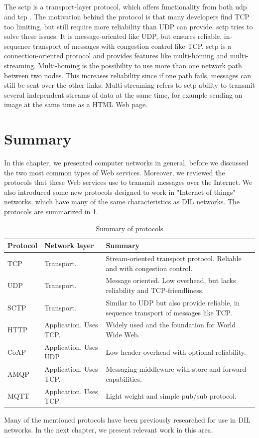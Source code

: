 \subsection{}

The \gls{sctp} is a transport-layer protocol, which offers functionality from
both \gls{udp} and \gls{tcp} \cite{rfc-sctp}. The motivation behind the protocol
is that many developers find TCP too limiting, but still require more
reliability than UDP can provide. \gls{sctp} tries to solve these issues. It is
message-oriented like UDP, but ensures reliable, in-sequence transport of
messages with congestion control like TCP. \gls{sctp} is a connection-oriented
protocol and provides features like multi-homing and multi-streaming.
Multi-homing is the possibility to use more than one network path between two
nodes. This increases reliability since if one path fails, messages can still be
sent over the other links. Multi-streaming refers to \gls{sctp} ability to
transmit several independent streams of data at the same time, for example
sending an image at the same time as a HTML Web page.


\section{Summary}

In this chapter, we presented computer networks in general, before we discussed
the two most common types of Web services. Moreover, we reviewed the protocols
that these Web services use to transmit messages over the Internet. We also
introduced some new protocols designed to work in "Internet of things" networks,
which have many of the same characteristics as DIL networks. The protocols are
summarized in \cref{table:protocols:summary}.

\begin{table}[h]
\begin{tabularx}{\textwidth}{| l | l | X |}
\hline
  \textbf{Protocol} & \textbf{Network layer} & \textbf{Summary} \\ \hline
  TCP & Transport. & Stream-oriented transport protocol. Reliable and with congestion control. \\ \hline
  UDP & Transport. & Message oriented. Low overhead, but lacks reliability and TCP-friendliness. \\ \hline
  SCTP & Transport. & Similar to UDP but also provide reliable, in sequence transport of messages like TCP. \\ \hline
  HTTP & Application. Uses TCP. &  Widely used and the foundation for World Wide Web. \\ \hline
  CoAP & Application. Uses UDP. & Low header overhead with optional reliability. \\ \hline
  AMQP & Application. Uses TCP. &  Messaging middleware with store-and-forward capabilities.\\ \hline
  MQTT & Application. Uses TCP & Light weight and simple pub/sub protocol. \\ \hline
\end{tabularx}
\caption{Summary of protocols}
\label{table:protocols:summary}
\end{table}

Many of the mentioned protocols have been previously researched for use in DIL
networks. In the next chapter, we present relevant work in this area.
